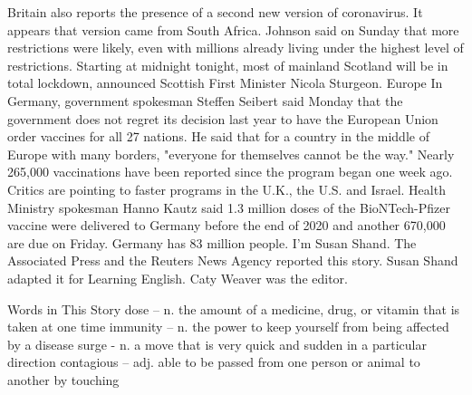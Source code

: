 Britain also reports the presence of a second new version of coronavirus. It appears that version came from South Africa.
Johnson said on Sunday that more restrictions were likely, even with millions already living under the highest level of restrictions.
Starting at midnight tonight, most of mainland Scotland will be in total lockdown, announced Scottish First Minister Nicola Sturgeon.
Europe
In Germany, government spokesman Steffen Seibert said Monday that the government does not regret its decision last year to have the European Union order vaccines for all 27 nations. He said that for a country in the middle of Europe with many borders, "everyone for themselves cannot be the way."
Nearly 265,000 vaccinations have been reported since the program began one week ago. Critics are pointing to faster programs in the U.K., the U.S. and Israel.
Health Ministry spokesman Hanno Kautz said 1.3 million doses of the BioNTech-Pfizer vaccine were delivered to Germany before the end of 2020 and another 670,000 are due on Friday. Germany has 83 million people.
I'm Susan Shand.
The Associated Press and the Reuters News Agency reported this story. Susan Shand adapted it for Learning English. Caty Weaver was the editor.

\begin{messagebox}
Words in This Story
dose – n. the amount of a medicine, drug, or vitamin that is taken at one time
immunity – n. the power to keep yourself from being affected by a disease
surge - n. a move that is very quick and sudden in a particular direction
contagious – adj. able to be passed from one person or animal to another by touching
\end{messagebox}

